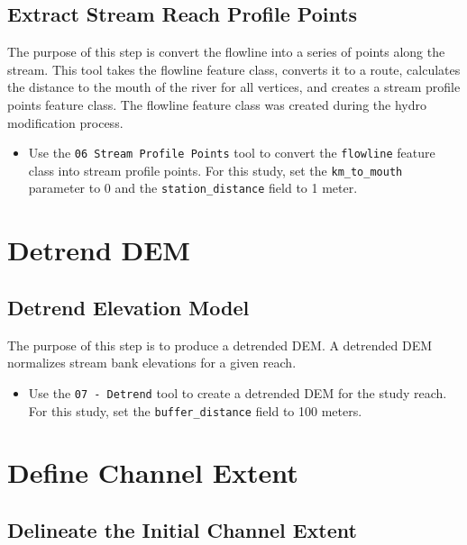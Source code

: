 \documentclass[]{book}
\providecommand{\tightlist}{%
  \setlength{\itemsep}{0pt}\setlength{\parskip}{0pt}}
\theoremstyle{definition}
\theoremstyle{definition}
\theoremstyle{definition}
\theoremstyle{remark}
\begin{document}
\subsection{Extract Stream Reach Profile
Points}\label{extract-stream-reach-profile-points}

The purpose of this step is convert the flowline into a series of points
along the stream. This tool takes the flowline feature class, converts
it to a route, calculates the distance to the mouth of the river for all
vertices, and creates a stream profile points feature class. The
flowline feature class was created during the hydro modification
process.

\begin{itemize}
\tightlist
\item
  Use the \texttt{06\ Stream\ Profile\ Points} tool to convert the
  \texttt{flowline} feature class into stream profile points. For this
  study, set the \texttt{km\_to\_mouth} parameter to 0 and the
  \texttt{station\_distance} field to 1 meter.
\end{itemize}

\section{Detrend DEM}\label{detrend-dem-1}

\subsection{Detrend Elevation Model}\label{detrend-elevation-model}

The purpose of this step is to produce a detrended DEM. A detrended DEM
normalizes stream bank elevations for a given reach.

\begin{itemize}
\tightlist
\item
  Use the \texttt{07\ -\ Detrend} tool to create a detrended DEM for the
  study reach. For this study, set the \texttt{buffer\_distance} field
  to 100 meters.
\end{itemize}

\section{Define Channel Extent}\label{define-channel-extent-1}

\subsection{Delineate the Initial Channel
Extent}\label{delineate-the-initial-channel-extent}
\end{document}

